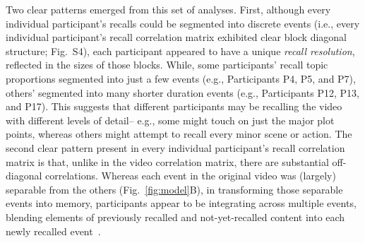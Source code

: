 \documentclass{article}
\newcommand{\corrmats}{S4}
\begin{document}
Two clear patterns emerged from this set of analyses.  First, although every individual participant's recalls could be segmented into discrete events (i.e., every individual participant's recall correlation matrix exhibited clear block diagonal structure; Fig.~\corrmats), each participant appeared to have a unique \textit{recall resolution}, reflected in the sizes of those blocks.  While, some participants' recall topic proportions segmented into just a few events (e.g., Participants P4, P5, and P7), others' segmented into many shorter duration events (e.g., Participants P12, P13, and P17).  This suggests that different participants may be recalling the video with different levels of detail-- e.g., some might touch on just the major plot points, whereas others might attempt to recall every minor scene or action.  The second clear pattern present in every individual participant's recall correlation matrix is that, unlike in the video correlation matrix, there are substantial off-diagonal correlations.  Whereas each event in the original video was (largely) separable from the others (Fig.~\ref{fig:model}B), in transforming those separable events into memory, participants appear to be integrating across multiple events, blending elements of previously recalled and not-yet-recalled content into each newly recalled event~\citep[Figs.~\ref{fig:model}E, \corrmats; also see][]{MannEtal11, HowaEtal12}.
\end{document}
